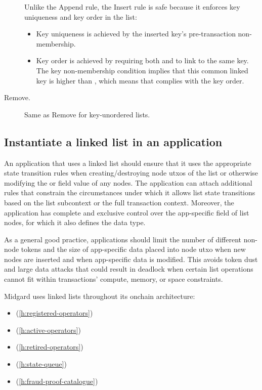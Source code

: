 \documentclass[../midgard.tex]{subfiles}
\begin{document}
\begin{description}
        Unlike the Append rule, the Insert rule is safe because it enforces key uniqueness and key order in the list:
        \begin{itemize}
            \item Key uniqueness is achieved by the inserted key's pre-transaction non-membership.
            \item Key order is achieved by requiring both  and  to link to the same key. The key non-membership condition implies that this common linked key is higher than , which means that  complies with the key order.
        \end{itemize}
    \item[Remove.] Same as Remove for key-unordered lists.
\end{description}

\subsection{Instantiate a linked list in an application}
\label{h:instantiate-list-in-application}

An application that uses a linked list should ensure that it uses the appropriate state transition rules when creating/destroying node utxos of the list or otherwise modifying the  or  field value of any nodes. The application can attach additional rules that constrain the circumstances under which it allows list state transitions based on the list subcontext or the full transaction context. Moreover, the application has complete and exclusive control over the app-specific  field of list nodes, for which it also defines the data type.

As a general good practice, applications should limit the number of different non-node tokens and the size of app-specific data placed into node utxo when new nodes are inserted and when app-specific data is modified. This avoids token dust and large data attacks that could result in deadlock when certain list operations cannot fit within transactions' compute, memory, or space constraints.

Midgard uses linked lists throughout its onchain architecture:
\begin{itemize}
    \item {} (\cref{h:registered-operators})
    \item {} (\cref{h:active-operators})
    \item {} (\cref{h:retired-operators})
    \item {} (\cref{h:state-queue})
    \item {} (\cref{h:fraud-proof-catalogue})
\end{itemize}
\end{document}
